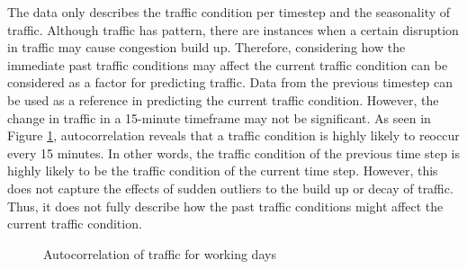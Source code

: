 The data only describes the traffic condition per timestep and the seasonality of traffic. Although traffic has pattern, there are instances when a certain disruption in traffic may cause congestion build up. Therefore, considering how the immediate past traffic conditions may affect the current traffic condition can be considered as a factor for predicting traffic. Data  from the previous timestep can be used as a reference in predicting the current traffic condition. However, the change in traffic in a 15-minute timeframe may not be significant. As seen in Figure \ref{autocorr_whyRE}, autocorrelation reveals that a traffic condition is highly likely to reoccur every 15 minutes. In other words, the traffic condition of the previous time step is highly likely to be the traffic condition of the current time step. However, this does not capture the effects of sudden outliers to the build up or decay of traffic. Thus, it does not fully describe how the past traffic conditions might affect the current traffic condition. 


\begin{figure}[h] 
\centering
  \centering
  \caption{Autocorrelation of traffic for working days}
  \label{autocorr_whyRE}
\end{figure}


